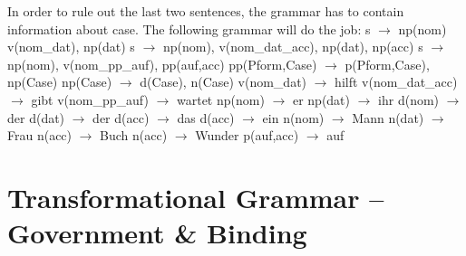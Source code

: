 \begin{enumerate}
In order to rule out the last two sentences, the grammar has to contain information about case. The following grammar will do the job:
\eal
\ex s $\to$ np(nom) v(nom\_dat), np(dat)
\ex s $\to$ np(nom), v(nom\_dat\_acc), np(dat), np(acc)
\ex s $\to$ np(nom), v(nom\_pp\_auf), pp(auf,acc)
\ex pp(Pform,Case) $\to$ p(Pform,Case), np(Case)
\ex np(Case) $\to$ d(Case), n(Case)
\ex v(nom\_dat) $\to$ hilft
\ex v(nom\_dat\_acc) $\to$ gibt
\ex v(nom\_pp\_auf) $\to$ wartet
\ex np(nom) $\to$ er
\ex np(dat) $\to$ ihr
\ex d(nom) $\to$ der
\ex d(dat) $\to$ der
\ex d(acc) $\to$ das
\ex d(acc) $\to$ ein
\ex n(nom) $\to$ Mann
\ex n(dat) $\to$ Frau
\ex n(acc) $\to$ Buch
\ex n(acc) $\to$ Wunder
\ex p(auf,acc) $\to$ auf
\zl

\end{enumerate}



\section{Transformational Grammar -- Government \& Binding}



\begin{figure}[H]
\centering
{}
\hfill
\end{figure}%


